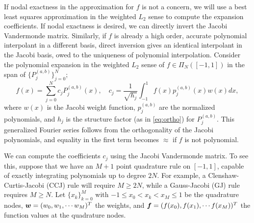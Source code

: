 If nodal exactness in the approximation for $f$ is not a concern, we will use a best least squares approximation in the weighted $L_2$ sense to compute the expansion coefficients. If nodal exactness is desired, we can directly invert the Jacobi Vandermonde matrix. Similarly, if $f$ is already a high order, accurate polynomial interpolant in a different basis, direct inversion gives an identical interpolant in the Jacobi basis, owed to the uniqueness of polynomial interpolation.
Consider the polynomial expansion in the weighted $L_2$ sense of $f \in \Pi_N([-1,1])$ in the span of $\{P_j^{(a,b)}\}_{j=0}^N$;
\begin{equation}\label{eq:ujac}
f(x) = \sum_{j=0}^N c_jP_j^{(a,b)}(x),\quad c_j = \frac{1}{\sqrt{h_j}}\int_{-1}^1 f(x)p_j^{(a,b)}(x)w(x)dx,
\end{equation}
where $w(x)$ is the Jacobi weight function, $p_j^{(a,b)}$ are the normalized polynomials, and $h_j$ is the structure factor (as in \eqref{eq:ortho}) for $P_j^{(a,b)}$. This generalized Fourier series follows from the orthogonality of the Jacobi polynomials, and equality in the first term becomes $\approx$ if $f$ is not polynomial.

We can compute the coefficients $c_j$ using the Jacobi Vandermonde matrix.
To see this, suppose that we have an $M+1$ point quadrature rule on $[-1,1]$, capable of exactly integrating polynomials up to degree $2N$. For example, a Clenshaw-Curtis-Jacobi (CCJ) rule will require $M\geq 2N$, while a Gauss-Jacobi (GJ) rule requires $M\geq N$. Let $\{x_k\}_{k=0}^{M}$ with $-1\leq x_0<x_k<x_{M}\leq1$ be the quadrature nodes, $\boldsymbol{w}=(w_0,w_1,\cdots w_{M})^T$ the weights, and $\boldsymbol{f} = (f(x_0),f(x_1),\cdots f(x_{M}))^T$ the function values at the quadrature nodes.  

